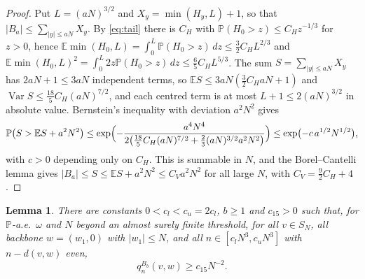 \documentclass[11pt]{amsart}
\newtheorem{lemma}[theorem]{Lemma}
\theoremstyle{remark}
\numberwithin{equation}{section}
\newcommand{\PP}{\mathbb{P}}
\newcommand{\EE}{\mathbb{E}}
\begin{document}
\begin{proof}
Put $L=(aN)^{3/2}$ and $X_y=\min(H_y,L)+1$, so that $|B_a|\le\sum_{|y|\le aN}X_y$. By \eqref{eq:tail} there is $C_H$ with $\PP(H_0>z)\le C_Hz^{-1/3}$ for $z>0$, hence $\EE\min(H_0,L)=\int_0^L\PP(H_0>z)\,dz\le\frac32C_HL^{2/3}$ and $\EE\min(H_0,L)^2=\int_0^L2z\PP(H_0>z)\,dz\le\frac65C_HL^{5/3}$. The sum $S=\sum_{|y|\le aN}X_y$ has $2aN+1\le3aN$ independent terms, so $\EE S\le3aN(\frac32C_HaN+1)$ and $\operatorname{Var}S\le\frac{18}5C_H(aN)^{7/2}$, and each centred term is at most $L+1\le2(aN)^{3/2}$ in absolute value. Bernstein's inequality with deviation $a^2N^2$ gives
\[
\PP\bigl(S>\EE S+a^2N^2\bigr)\le\exp\Bigl(-\frac{a^4N^4}{2\bigl(\frac{18}5C_H(aN)^{7/2}+\frac23(aN)^{3/2}a^2N^2\bigr)}\Bigr)\le\exp\bigl(-c\,a^{1/2}N^{1/2}\bigr),
\]
with $c>0$ depending only on $C_H$. This is summable in $N$, and the Borel--Cantelli lemma gives $|B_a|\le S\le\EE S+a^2N^2\le C_Va^2N^2$ for all large $N$, with $C_V=\frac92C_H+4$.
\end{proof}

\begin{lemma}\label{lem:low}
There are constants $0<c_l<c_u=2c_l$, $b\ge1$ and $c_{15}>0$ such that, for $\PP$-a.e.\ $\omega$ and $N$ beyond an almost surely finite threshold, for all $v\in S_N$, all backbone $w=(w_1,0)$ with $|w_1|\le N$, and all $n\in[c_lN^3,c_uN^3]$ with $n-d(v,w)$ even,
\[
q^{B_b}_n(v,w)\ge c_{15}N^{-2}.
\]
\end{lemma}
\end{document}
